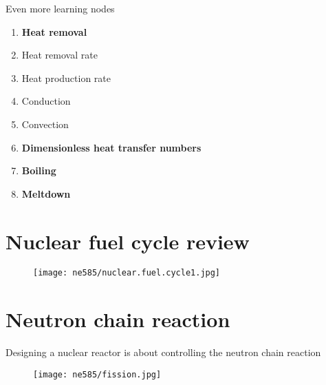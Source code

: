 \documentclass[aspectratio=1610,pdftex,dvipsnames,compress,xcolor={dvipsnames}]{beamer}
\begin{document}
\begin{frame}{Even more learning nodes}
    \begin{enumerate}[series=outerlist,topsep=0pt,itemsep=1pt,leftmargin=*,label=(\arabic*)]
                \item[]\textbf{Heat removal}
                \item[]Heat removal rate
                \item[]Heat production rate
                \item[]Conduction
                \item[]Convection
                    \vspace{0.15in}
                \item[]\textbf{Dimensionless heat transfer numbers}
                    \vspace{0.15in}
                \item[]\textbf{Boiling}
                    \vspace{0.15in}
                \item[]\textbf{Meltdown}
    \end{enumerate}
\end{frame}


\section{Nuclear fuel cycle review}


\addtocounter{framenumber}{-1} 
\begin{frame}{}
    \begin{figure}
        \centering
        \texttt{[image: ne585/nuclear.fuel.cycle1.jpg]}
    \end{figure}
\end{frame}


\section{Neutron chain reaction}


\addtocounter{framenumber}{-1} 
\begin{frame}{Designing a nuclear reactor is about controlling the neutron chain reaction}
    \begin{figure}
        \centering
        \texttt{[image: ne585/fission.jpg]}
    \end{figure}
\end{frame}
\end{document}
